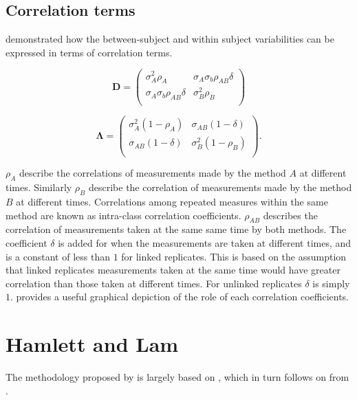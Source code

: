 \documentclass[12pt, a4paper]{report}
\theoremstyle{plain}
\theoremstyle{definition}
\theoremstyle{remark}
\begin{document}
\subsection{Correlation terms}
\citet{hamlett} demonstrated how the between-subject and within subject variabilities can be expressed in terms of
correlation terms.

\[
\boldsymbol{D} = \left( \begin{array}{cc}
\sigma^2_{A}\rho_{A} & \sigma_{A}\sigma_{b}\rho_{AB}\delta \\
\sigma_{A}\sigma_{b}\rho_{AB}\delta & \sigma^2_{B}\rho_{B}\\

\end{array}\right)
\]

\[
\boldsymbol{\Lambda} = \left(
\begin{array}{cc}
\sigma^2_{A}(1-\rho_{A}) & \sigma_{AB}(1-\delta)  \\
\sigma_{AB}(1-\delta) & \sigma^2_{B}(1-\rho_{B}) \\
\end{array}\right).
\]

$\rho_{A}$ describe the correlations of measurements made by the method $A$ at different times. Similarly $\rho_{B}$ describe the correlation of measurements made by the method $B$ at different times. Correlations among repeated measures within the same method are known as intra-class correlation coefficients. $\rho_{AB}$ describes the correlation of measurements taken at the same same time by both methods. The coefficient $\delta$ is added for when the measurements are taken at different times, and is a constant of less than $1$ for linked replicates. This is based on the assumption that linked replicates measurements taken at the same time would have greater correlation than those taken at different times. For unlinked replicates $\delta$ is simply $1$. \citet{hamlett} provides a useful graphical depiction of the role of each correlation coefficients.

\newpage



\section{Hamlett and Lam}
The methodology proposed by \citet{Roy2009} is largely based on \citet{hamlett}, which in turn follows on from \citet{lam}.
\end{document}
